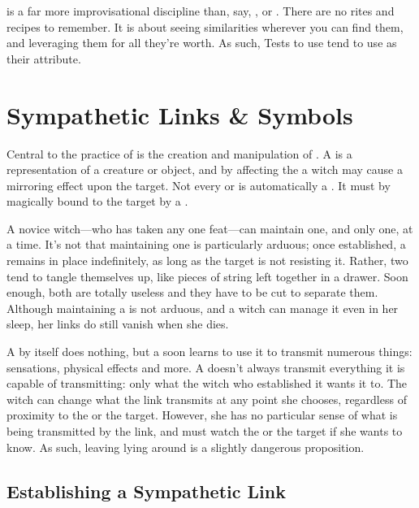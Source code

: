 
 is a far more improvisational discipline than, say, , or .
There are no rites and recipes to remember.
It is about seeing similarities wherever you can find them, and leveraging them for all they're worth.
As such, Tests to use  tend to use  as their attribute.

\section{Sympathetic Links \& Symbols}

Central to the practice of  is the creation and manipulation of {\symbols}.
A {\symbol} is a representation of a creature or object, and by affecting the {\symbol} a witch may cause a mirroring effect upon the target.
Not every  or  is automatically a {\symbol}.
It must by magically bound to the target by a {\symlink}.

A novice witch---who has taken any one  feat---can maintain one, and only one, {\symlink} at a time.
It's not that maintaining one is particularly arduous; once established, a {\symlink} remains in place indefinitely, as long as the target is not resisting it.
Rather, two {\symlinks} tend to tangle themselves up, like pieces of string left together in a drawer.
Soon enough, both are totally useless and they have to be cut to separate them.
Although maintaining a {\symlink} is not arduous, and a witch can manage it even in her sleep, her links do still vanish when she dies.

A {\symlink} by itself does nothing, but a  soon learns to use it to transmit numerous things: sensations, physical effects and more.
A {\symlink} doesn't always transmit everything it is capable of transmitting: only what the witch who established it wants it to.
The witch can change what the link transmits at any point she chooses, regardless of proximity to the {\symbol} or the target.
However, she has no particular sense of what is being transmitted by the link, and must watch the {\symbol} or the target if she wants to know.
As such, leaving {\symbols} lying around is a slightly dangerous proposition.

\subsection{Establishing a Sympathetic Link}

